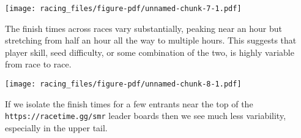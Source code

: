 \documentclass[
  letterpaper,
  DIV=11,
  numbers=noendperiod]{scrartcl}
\newenvironment{Shaded}{\begin{snugshade}}{\end{snugshade}}
\newcommand{\AttributeTok}[1]{\textcolor[rgb]{0.40,0.45,0.13}{#1}}
\newcommand{\ControlFlowTok}[1]{\textcolor[rgb]{0.00,0.23,0.31}{#1}}
\newcommand{\DecValTok}[1]{\textcolor[rgb]{0.68,0.00,0.00}{#1}}
\newcommand{\FunctionTok}[1]{\textcolor[rgb]{0.28,0.35,0.67}{#1}}
\newcommand{\NormalTok}[1]{\textcolor[rgb]{0.00,0.23,0.31}{#1}}
\newcommand{\OtherTok}[1]{\textcolor[rgb]{0.00,0.23,0.31}{#1}}
\newcommand{\SpecialCharTok}[1]{\textcolor[rgb]{0.37,0.37,0.37}{#1}}
\newcommand{\StringTok}[1]{\textcolor[rgb]{0.13,0.47,0.30}{#1}}
\begin{document}
\texttt{[image: racing\_files/figure-pdf/unnamed-chunk-7-1.pdf]}

The finish times across races vary substantially, peaking near an hour
but stretching from half an hour all the way to multiple hours. This
suggests that player skill, seed difficulty, or some combination of the
two, is highly variable from race to race.

\begin{Shaded}
\end{Shaded}

\texttt{[image: racing\_files/figure-pdf/unnamed-chunk-8-1.pdf]}

If we isolate the finish times for a few entrants near the top of the
\texttt{https://racetime.gg/smr} leader boards then we see much less
variability, especially in the upper tail.

\begin{Shaded}
\end{Shaded}
\end{document}
